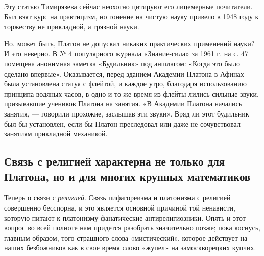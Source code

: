 Эту  статью   Тимирязева  сейчас  неохотно  цитируют   его  лицемерные
почитатели. Был  взят курс на  практицизм, но гонение на  чистую науку
привело в 1948 году к торжеству не прикладной, а грязной науки.

Но,  может быть,  Платон не  допускал никаких  практических применений
науки? И это неверно. В №  4 популярного журнала «Знание-сила» за 1961
г.  на с.  47  помещена анонимная  заметка  «Будильник» под  аншлагом:
«Когда это было сделано  впервые». Оказывается, перед зданием Академии
Платона в  Афинах была  установлена статуя с  флейтой, и  каждое утро,
благодаря использованию принципа  водяных часов, в одно и  то же время
из  флейты  лились  сильные  звуки, призывавшие  учеников  Платона  на
занятия. «В Академии Платона  начались занятия, --- говорили прохожие,
заслышав эти звуки». Вряд ли этот будильник был бы установлен, если бы
Платон  преследовал  или  даже  не  сочувствовал  занятиям  прикладной
механикой.

\subsection{Связь с  религией характерна не  только для Платона,  но и
для многих крупных математиков}

Теперь о  связи с \emph{религией}.  Связь пифагореизма и  платонизма с
религией совершенно  бесспорна, и  это является основной  причиной той
ненависти, которую питают  к платонизму фанатические антирелигиозники.
Опять  и   этот  вопрос  во   всей  полноте  нам   придется  разобрать
значительно позже; пока коснусь, главным образом, того страшного слова
«мистический», которое действует на наших безбожников как в свое время
слово «жупел» на замоскворецких купчих.

